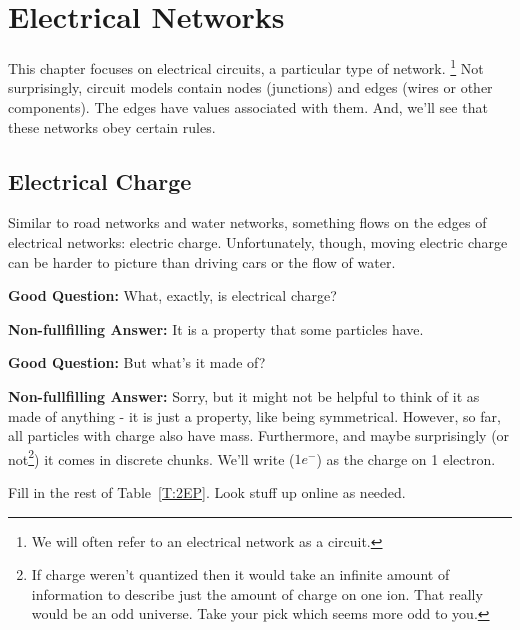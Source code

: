 \chapter{Electrical Networks}
This chapter focuses on electrical circuits, a particular type of network. \footnote{We will often refer to an electrical network as a circuit.} Not surprisingly, circuit models contain nodes (junctions) and edges (wires or other components). The edges have values associated with them. And, we'll see that these networks obey certain rules.\par

\section{Electrical Charge}
Similar to road networks and water networks, something flows on the edges of electrical networks: electric charge. Unfortunately, though, moving electric charge can be harder to picture than driving cars or the flow of water.\par

\vspace{6pt}
\setlength{\hangindent}{30pt}\noindent
\textbf{Good Question:} What, exactly, is electrical charge? \par
\vspace{6pt}
\setlength{\hangindent}{30pt}\noindent
\textbf{Non-fullfilling Answer:} It is a property that some particles have. \par
\vspace{6pt}
\setlength{\hangindent}{30pt}\noindent
\textbf{Good Question:} But what's it made of? \par
\vspace{6pt}
\setlength{\hangindent}{30pt}\noindent
\textbf{Non-fullfilling Answer:} Sorry, but it might not be helpful to think of it as made of anything - it is just a property, like being symmetrical. However, so far, all particles with charge also have mass. Furthermore, and maybe surprisingly (or not\footnote{If charge weren't quantized then it would take an infinite amount of information to describe just the amount of charge on one ion. That really would be an odd universe. Take your pick which seems more odd to you.}) it comes in discrete chunks. We'll write ($1 e^-$) as the charge on 1 electron.

\begin{blevel}
Fill in the rest of Table~\ref{T:2EP}. Look stuff up online as needed.
\end{blevel}

